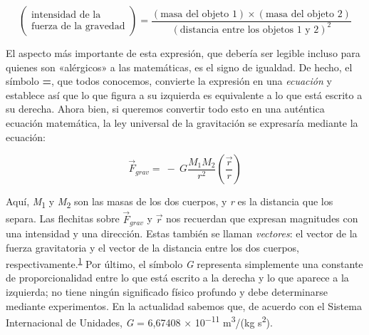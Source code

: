 \[
\begin{pmatrix}
\text{intensidad de la} \\
\text{fuerza de la gravedad}
\end{pmatrix}
= \frac{(\text{masa del objeto 1})\times(\text{masa del objeto 2})}
{(\text{distancia entre los objetos 1 y 2})^{2}}
\]

El aspecto más importante de esta expresión, que debería ser legible incluso para
quienes son «alérgicos» a las matemáticas, es el signo de igualdad. De hecho, el
símbolo \textbf{=}, que todos conocemos, convierte la expresión en una
\emph{ecuación} y establece así que lo que figura a su izquierda es equivalente
a lo que está escrito a su derecha. Ahora bien, si queremos convertir todo esto
en una auténtica ecuación matemática, la ley universal de la gravitación se
expresaría mediante la ecuación:

\begin{equation}\label{eq:02-01}
{\overrightarrow{F}}_{grav} = \  - \ G\frac{M_{1}M_{2}}{r^{2}}\left( \frac{\overrightarrow{r}}{r} \right)
\end{equation}

Aquí, \emph{M}\textsubscript{1} y \emph{M}\textsubscript{2} son las masas de los
dos cuerpos, y \emph{r} es la distancia que los separa. Las flechitas sobre
\({\overrightarrow{F}}_{grav}\) y \(\overrightarrow{r}\) nos recuerdan que expresan
magnitudes con una intensidad y una dirección. Estas también se llaman
\emph{vectores}: el vector de la fuerza gravitatoria
y el vector de la distancia entre los dos cuerpos,
respectivamente.\textsuperscript{\hyperlink{note:02-01}{1}} Por último, el símbolo
\emph{G} representa simplemente una constante de proporcionalidad entre lo que
está escrito a la derecha y lo que aparece a la izquierda; no tiene ningún
significado físico profundo y debe determinarse mediante experimentos. En la
actualidad sabemos que, de acuerdo con el Sistema Internacional de Unidades,
\emph{G} = 6,67408 × 10\textsuperscript{−11} m\textsuperscript{3}/(kg s\textsuperscript{2}).


